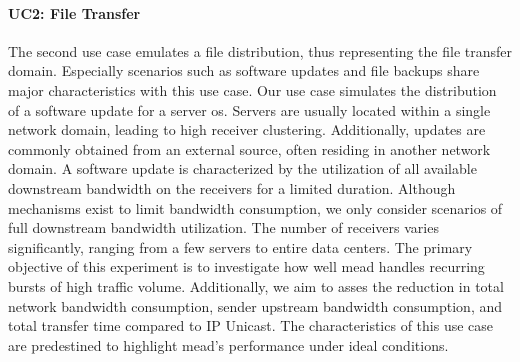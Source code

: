 \paragraph{UC2: File Transfer} %
\label{par:EX2: File Transfer}
The second use case emulates a file distribution, thus representing the
    file transfer domain.
Especially scenarios such as software updates and file backups share major
    characteristics with this use case.
Our use case simulates the distribution of a software update for a server
    \gls{os}.
Servers are usually located within a single network domain, leading to high
    receiver clustering.
Additionally, updates are commonly obtained from an external source, often
    residing in another network domain.
A software update is characterized by the utilization of all available
    downstream bandwidth on the receivers for a limited duration.
Although mechanisms exist to limit bandwidth consumption, we only consider 
    scenarios of full downstream bandwidth utilization.
The number of receivers varies significantly, ranging from a few servers to
    entire data centers.
The primary objective of this experiment is to investigate how well \gls{mead}
    handles recurring bursts of high traffic volume.
Additionally, we aim to asses the reduction in total network bandwidth
    consumption, sender upstream bandwidth consumption, and total transfer time 
    compared to IP Unicast.
The characteristics of this use case are predestined to highlight \gls{mead}'s
    performance under ideal conditions.

